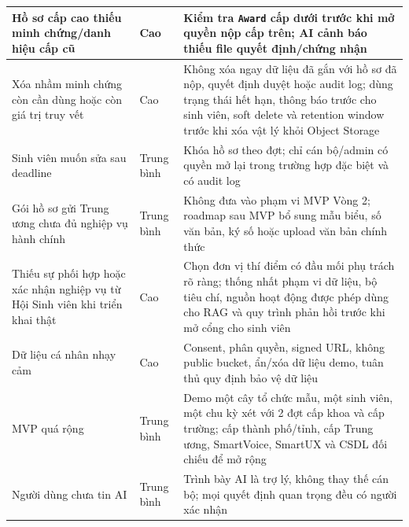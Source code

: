 \begin{longtable}{|>{\raggedright\arraybackslash}p{}|
                  >{\raggedright\arraybackslash}p{}|
                  >{\raggedright\arraybackslash}p{}|}
Hồ sơ cấp cao thiếu minh chứng/danh hiệu cấp cũ &
Cao &
Kiểm tra \texttt{Award} cấp dưới trước khi mở quyền nộp cấp trên; AI cảnh báo thiếu file quyết định/chứng nhận \\ \hline

Xóa nhầm minh chứng còn cần dùng hoặc còn giá trị truy vết &
Cao &
Không xóa ngay dữ liệu đã gắn với hồ sơ đã nộp, quyết định duyệt hoặc audit log; dùng trạng thái hết hạn, thông báo trước cho sinh viên, soft delete và retention window trước khi xóa vật lý khỏi Object Storage \\ \hline

Sinh viên muốn sửa sau deadline &
Trung bình &
Khóa hồ sơ theo đợt; chỉ cán bộ/admin có quyền mở lại trong trường hợp đặc biệt và có audit log \\ \hline

Gói hồ sơ gửi Trung ương chưa đủ nghiệp vụ hành chính &
Trung bình &
Không đưa vào phạm vi MVP Vòng 2; roadmap sau MVP bổ sung mẫu biểu, số văn bản, ký số hoặc upload văn bản chính thức \\ \hline

Thiếu sự phối hợp hoặc xác nhận nghiệp vụ từ Hội Sinh viên khi triển khai thật &
Cao &
Chọn đơn vị thí điểm có đầu mối phụ trách rõ ràng; thống nhất phạm vi dữ liệu, bộ tiêu chí, nguồn hoạt động được phép dùng cho RAG và quy trình phản hồi trước khi mở cổng cho sinh viên \\ \hline

Dữ liệu cá nhân nhạy cảm &
Cao &
Consent, phân quyền, signed URL, không public bucket, ẩn/xóa dữ liệu demo, tuân thủ quy định bảo vệ dữ liệu \\ \hline

MVP quá rộng &
Trung bình &
Demo một cây tổ chức mẫu, một sinh viên, một chu kỳ xét với 2 đợt cấp khoa và cấp trường; cấp thành phố/tỉnh, cấp Trung ương, SmartVoice, SmartUX và CSDL đối chiếu để mở rộng \\ \hline

Người dùng chưa tin AI &
Trung bình &
Trình bày AI là trợ lý, không thay thế cán bộ; mọi quyết định quan trọng đều có người xác nhận \\ \hline

\end{longtable}
\endgroup